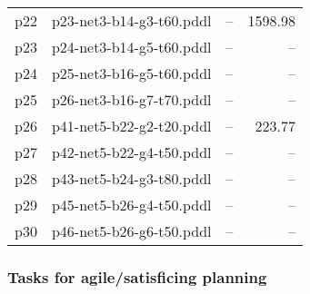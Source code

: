 \documentclass{article}
\begin{document}
\begin{center}
\begin{tabular}{@{}l|r|r|r@{}}
  p22& p23-net3-b14-g3-t60.pddl&--&1598.98\\
  p23& p24-net3-b14-g5-t60.pddl&--&--\\
  p24& p25-net3-b16-g5-t60.pddl&--&--\\
  p25& p26-net3-b16-g7-t70.pddl&--&--\\
  p26& p41-net5-b22-g2-t20.pddl&--&223.77\\
  p27& p42-net5-b22-g4-t50.pddl&--&--\\
  p28& p43-net5-b24-g3-t80.pddl&--&--\\
  p29& p45-net5-b26-g4-t50.pddl&--&--\\
  p30& p46-net5-b26-g6-t50.pddl&--&--
                            \end{tabular}
                            \end{center}
                    

                    \subsubsection*{Tasks for agile/satisficing planning}
                    
\end{document}
